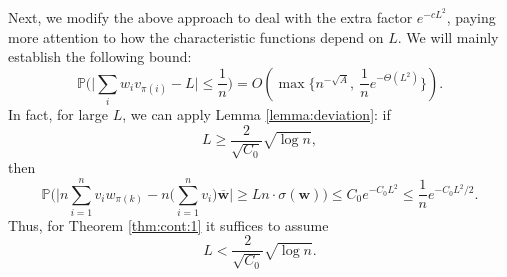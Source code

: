 \documentclass[reqno]{amsart}
\renewcommand\P{{\mathbb{P}}}
\newcommand\BMw{{\bm w}}
\theoremstyle{plain}
\theoremstyle{definition}
\begin{document}
Next, we modify the above approach to deal with the extra factor $e^{-c L^{2}}$, paying more attention to how the characteristic functions depend on $L$. We will mainly establish the following bound:
\begin{equation}\label{eqn:modification:1}
\P\Big( \Big| \sum_{i} w_{i} v_{\pi(i)} - L \Big| \le \frac{1}{n} \Big) 
= O\left( \max\Big\{ n^{-\sqrt{A}}, \ \frac{1}{n} e^{-\Theta(L^{2})} \Big\} \right).
\end{equation}
In fact, for large $L$, we can apply Lemma \ref{lemma:deviation}: if 
\[
L \ge \frac{2}{\sqrt{C_{0}}} \sqrt{\log n},
\]
then
\[
\P\Big( \Big| n\sum_{i=1}^{n} v_{i} w_{\pi(k)} -n \Big( \sum_{i=1}^{n} v_{i} \Big) \overline{\BMw} \Big| 
\ge L n \cdot \sigma(\BMw) \Big) 
\le C_{0} e^{-C_{0} L^{2}} 
\le \frac{1}{n} e^{-C_{0} L^{2} / 2}.
\]
Thus, for Theorem \ref{thm:cont:1} it suffices to assume
\begin{equation}\label{eqn:L<}
L < \frac{2}{\sqrt{C_{0}}} \sqrt{\log n}.
\end{equation}
\end{document}
